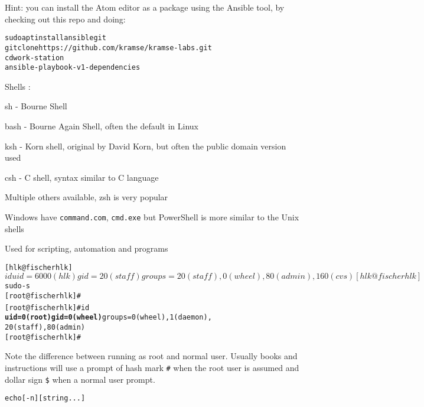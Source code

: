 \documentclass[Screen16to9,17pt]{foils}
\begin{document}
Hint: you can install the Atom editor as a package using the Ansible tool, by checking out this repo and doing:
\begin{alltt}
sudo apt install ansible git
git clone https://github.com/kramse/kramse-labs.git
cd work-station
ansible-playbook -v 1-dependencies
\end{alltt}







\begin{list1}
\item Shells :
  \begin{list2}
    \item sh - Bourne Shell
\item bash - Bourne Again Shell, often the default in Linux
\item ksh - Korn shell, original by David Korn, but often the public domain version used
\item csh - C shell, syntax similar to C language
\item Multiple others available, zsh is very popular
  \end{list2}
\item Windows have \verb+command.com+, \verb+cmd.exe+ but PowerShell is more similar to the Unix shells
\item Used for scripting, automation and programs
\end{list1}





\begin{alltt}
\small
[hlk@fischer hlk]$ id
uid=6000(hlk) gid=20(staff) groups=20(staff),
0(wheel), 80(admin), 160(cvs)
[hlk@fischer hlk]$ sudo -s
[root@fischer hlk]#
[root@fischer hlk]# id {\bf
uid=0(root) gid=0(wheel)} groups=0(wheel), 1(daemon),
20(staff), 80(admin)
[root@fischer hlk]#
\end{alltt}

Note the difference between running as root and normal user. Usually books and instructions will use a prompt of hash mark \verb+#+ when the root user is assumed and dollar sign \verb+$+ when a normal user prompt.



\begin{alltt}
echo [-n] [string ...]
\end{alltt}
\end{document}
